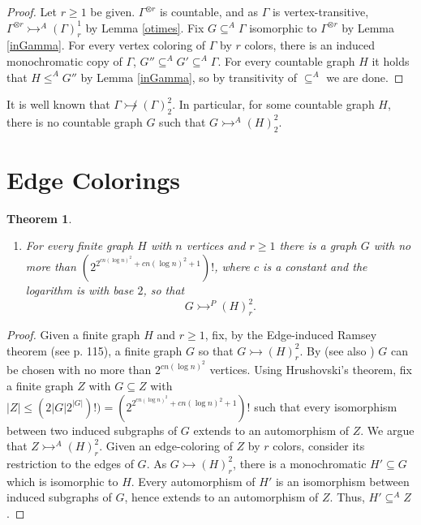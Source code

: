\documentclass[11pt]{amsart}
\newcommand{\ars}{\rightarrowtail}
\newcommand{\su}{\subseteq}
\newtheorem{theorem}{Theorem}[section]
\begin{document}
\begin{proof}
  Let $r\ge 1$ be given. $\Gamma^{\otimes r}$ is countable, and as
  $\Gamma$ is vertex-transitive, $\Gamma^{\otimes r}\ars^A(\Gamma)^1_r$
  by Lemma \ref{otimes}.  Fix $G\su^A\Gamma$ isomorphic to
  $\Gamma^{\otimes r}$ by Lemma \ref{inGamma}. For every vertex
  coloring of $\Gamma$ by $r$ colors, there is an induced
  monochromatic  copy of $\Gamma$,  $G''\su^A G'\su^A \Gamma$. For every
  countable graph $H$ it holds that $H\le^A G''$ by Lemma
  \ref{inGamma}, so by transitivity of $\su^A$ we are done.
\end{proof}

It is well known \cite{EHP} that $\Gamma \not\ars (\Gamma)^2_2$.
In particular, for some countable graph $H$, there is no
countable graph $G$ such that $G\ars^A(H)^2_2$.
\section{Edge Colorings}

\begin{theorem}\label{edge}
\begin{enumerate}
\item For every finite graph $H$ with $n$ vertices and $r\ge 1$ there
  is a graph $G$ with no more than $(2^{2^{cn(\log n)^2} + cn (\log
      n)^2 +1})!$, where $c$ is a constant and the logarithm is with
    base $2$,  so that
\[G\ars^{P}(H)^2_r.\]
\end{enumerate}
\end{theorem}

\begin{proof}
 Given a finite graph $H$ and $r\ge 1$, fix, by the Edge-induced
  Ramsey theorem (see \cite{GRS} p. 115), a finite graph $G$ so that
  $G\ars (H)^2_r$. By \cite{KPR} (see also \cite{FS}) $G$ can be
  chosen with no more than $2^{cn (\log n)^2}$ vertices.  Using
  Hrushovski's theorem, fix a finite graph $Z$ with $G\su Z$ with
  $|Z|\le (2|G|2^{|G|})!)=(2^{2^{cn(\log n)^2} + cn (\log
      n)^2 +1})!$ such that every isomorphism between two induced
  subgraphs of $G$ extends to an automorphism of $Z$. We argue that
  $Z\ars^A(H)^2_r$.  Given an edge-coloring of $Z$ by $r$ colors,
  consider its restriction to the edges of $G$. As $G\ars (H)^2_r$,
  there is a monochromatic $H'\su G$ which is isomorphic to $H$.
  Every automorphism of $H'$ is an isomorphism between induced
  subgraphs of $G$, hence extends to an automorphism of $Z$. Thus,
  $H'\su^A Z$.
\end{proof}
\end{document}
